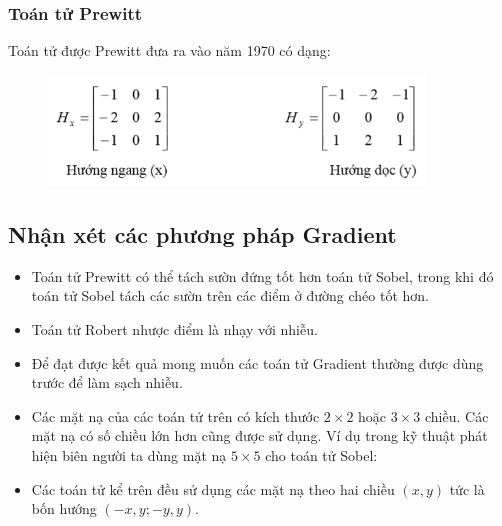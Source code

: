 \documentclass[../report.tex]{subfiles}
\begin{document}
\subsubsection{Toán tử Prewitt}
Toán tử được Prewitt đưa ra vào năm 1970 có dạng:
\begin{figure}[H]
\centering
\includegraphics[width=10cm]{figures/prewitt-operator.png}
\end{figure}

\subsection{Nhận xét các phương pháp Gradient}
\begin{itemize}
\item Toán tử Prewitt có thể tách sườn đứng tốt hơn toán tử Sobel, 
trong khi đó toán tử Sobel tách các sườn trên các điểm ở 
đường chéo tốt hơn.

\item Toán tử Robert nhược điểm là nhạy với nhiễu.

\item Để đạt được kết quả mong muốn các toán tử Gradient 
    thường được dùng trước để làm sạch nhiễu.

\item Các mặt nạ của các toán tử trên có kích 
thước $2 \times 2$ hoặc $3 \times 3$ chiều. 
Các mặt nạ có số chiều lớn hơn cũng được sử dụng. 
Ví dụ trong kỹ thuật phát hiện biên người ta dùng mặt 
nạ $5 \times 5$ cho toán tử Sobel:

\item Các toán tử kể trên đều sử dụng các mặt nạ theo 
hai chiều $(x, y)$ tức là bốn hướng $(-x, y; -y, y)$.
\end{itemize}
\end{document}

